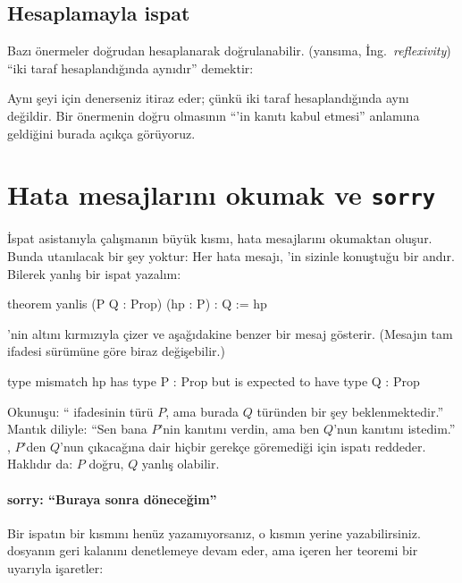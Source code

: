 \subsection{Hesaplamayla ispat}

Bazı önermeler doğrudan hesaplanarak doğrulanabilir.  (yansıma,
İng.\ \emph{reflexivity}) ``iki taraf hesaplandığında aynıdır'' demektir:


Aynı şeyi  için denerseniz \Lean{} itiraz eder; çünkü iki taraf
hesaplandığında aynı değildir. Bir önermenin doğru olmasının ``\Lean{}'in
kanıtı kabul etmesi'' anlamına geldiğini burada açıkça görüyoruz.

\section{Hata mesajlarını okumak ve \texttt{sorry}}\label{sec:hatalar}

İspat asistanıyla çalışmanın büyük kısmı, hata mesajlarını okumaktan oluşur.
Bunda utanılacak bir şey yoktur: Her hata mesajı, \Lean{}'in sizinle
konuştuğu bir andır. Bilerek yanlış bir ispat yazalım:

\begin{leankod}
theorem yanlis (P Q : Prop) (hp : P) : Q := hp
\end{leankod}

\Lean{} 'nin altını kırmızıyla çizer ve aşağıdakine benzer bir mesaj
gösterir. (Mesajın tam ifadesi \Lean{} sürümüne göre biraz değişebilir.)

\begin{leanhata}
type mismatch
  hp
has type
  P : Prop
but is expected to have type
  Q : Prop
\end{leanhata}

Okunuşu: `` ifadesinin türü $P$, ama burada $Q$ türünden bir şey
beklenmektedir.'' Mantık diliyle: ``Sen bana $P$'nin kanıtını verdin, ama
ben $Q$'nun kanıtını istedim.'' \Lean{}, $P$'den $Q$'nun çıkacağına dair
hiçbir gerekçe göremediği için ispatı reddeder. Haklıdır da: $P$ doğru,
$Q$ yanlış olabilir.

\paragraph{sorry: ``Buraya sonra döneceğim''}
Bir ispatın bir kısmını henüz yazamıyorsanız, o kısmın yerine 
yazabilirsiniz. \Lean{} dosyanın geri kalanını denetlemeye devam eder,
ama  içeren her teoremi bir uyarıyla işaretler:


